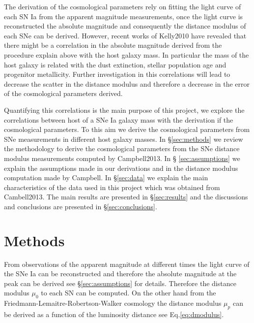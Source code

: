 \documentclass[11pt]{article}
\begin{document}
The derivation of the cosmological parameters rely on fitting the
light curve of each SN Ia from the apparent magnitude measurements,
once the light curve is reconstructed the absolute magnitude and
consequently the distance modulus of each SNe can be derived. However,
recent works of Kelly2010 have revealed that there might be a correlation in
the absolute magnitude derived from the procedure explain above with
the host galaxy mass. In particular the mass of the host galaxy is
related with the dust extinction, stellar population age and
progenitor metallicity. Further investigation in this correlations
will lead to decrease the scatter in the distance modulus and
therefore a decrease in the error of the cosmological parameters
derived.

Quantifying this correlations is the main purpose of this project,
we explore the correlations between host of a SNe Ia 
galaxy mass with the derivation if the cosmological parameters.
To this aim we derive the cosmological parameters from SNe
measurements in different host galaxy masses.
In \S \ref{sec:methods} we review the methodology to
derive the cosmological parameters from the SNe distance modulus
measurements computed by Campbell2013. In \S
\ref{sec:assumptions} we explain the assumptions made in our derivations
and in the distance modulus computation made by Campbell. 
In \S \ref{sec:data} we explain the main characteristics of the data used in this
project which was obtained from Cambell2013.
 The main results are presented in \S \ref{sec:results} and the
discussions and conclusions are presented in \S \ref{sec:conclusions}.



\section{Methods}{\label{sec:methods}}


From observations of the apparent magnitude at different times the light
curve of the SNe Ia can be reconstructed and therefore the absolute
magnitude at the peak can be derived see \S \ref{sec:assumptions} for
details. Therefore the distance modulus $\mu_0$ to each SN can be computed.
On the other hand from the Friedmann-Lemaitre-Robertson-Walker
cosmology the distance modulus $\mu_p$ can be derived as a function of the
luminosity distance see Eq.\ref{eq:dmodulus}.
\end{document}
